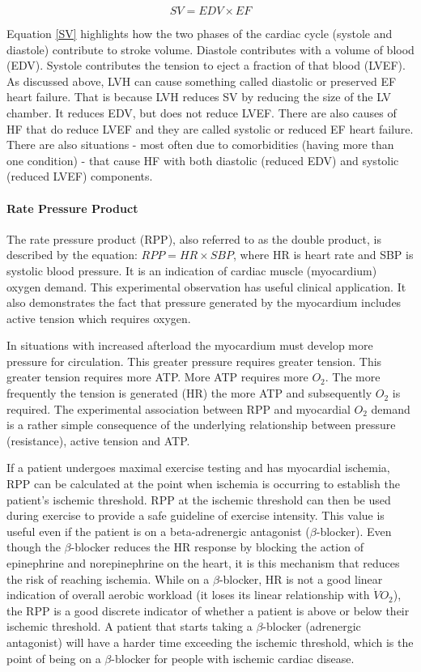 \begin{equation}
    SV = EDV \times EF
    \label{SV}
\end{equation}

Equation \ref{SV} highlights how the two phases of the cardiac cycle (systole and diastole) contribute to stroke volume. Diastole contributes with a volume of blood (EDV). Systole contributes the tension to eject a fraction of that blood (LVEF). As discussed above, LVH can cause something called diastolic or preserved EF heart failure. That is because LVH reduces SV by reducing the size of the LV chamber. It reduces EDV, but does not reduce LVEF. There are also causes of HF that do reduce LVEF and they are called systolic or reduced EF heart failure. There are also situations - most often due to comorbidities (having more than one condition) - that cause HF with both diastolic (reduced EDV) and systolic (reduced LVEF) components. 

\paragraph{Rate Pressure Product}

The rate pressure product (RPP), also referred to as the double product, is described by the equation: $RPP = HR \times SBP$, where HR is heart rate and SBP is systolic blood pressure. It is an indication of cardiac muscle (myocardium) oxygen demand. This experimental observation has useful clinical application. It also demonstrates the fact that pressure generated by the myocardium includes active tension which requires oxygen.

In situations with increased afterload the myocardium must develop more pressure for circulation. This greater pressure requires greater tension. This greater tension requires more ATP. More ATP requires more $O_2$. The more frequently the tension is generated (HR) the more ATP and subsequently $O_2$ is required. The experimental association between RPP and myocardial $O_2$ demand is a rather simple consequence of the underlying relationship between pressure (resistance), active tension and ATP.

If a patient undergoes maximal exercise testing and has myocardial ischemia, RPP can be calculated at the point when ischemia is occurring to establish the patient’s ischemic threshold. RPP at the ischemic threshold can then be used during exercise to provide a safe guideline of exercise intensity. This value is useful even if the patient is on a beta-adrenergic antagonist ($\beta$-blocker). Even though the $\beta$-blocker reduces the HR response by blocking the action of epinephrine and norepinephrine on the heart, it is this mechanism that reduces the risk of reaching ischemia. While on a $\beta$-blocker, HR is not a good linear indication of overall aerobic workload (it loses its linear relationship with $\dot{V}O_2$), the RPP is a good discrete indicator of whether a patient is above or below their ischemic threshold. A patient that starts taking a $\beta$-blocker (adrenergic antagonist) will have a harder time exceeding the ischemic threshold, which is the point of being on a $\beta$-blocker for people with ischemic cardiac disease. 

